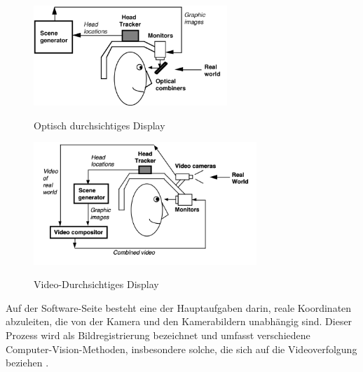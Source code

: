 \newpage

\vspace{1cm}

\begin{figure}[h!]
    \centering
    \includegraphics[width=0.65\textwidth]{attachments/Diagram_2.png}
    \caption{Optisch durchsichtiges Display}  \cite{Azuma1997ASO}
    \end{figure}


\vspace{1cm}

\begin{figure}[h!]
    \centering
    \includegraphics[width=0.75\textwidth]{attachments/Diagram_1.png}
    \caption{Video-Durchsichtiges Display}  \cite{Azuma1997ASO}
    \end{figure}

Auf der Software-Seite besteht eine der Hauptaufgaben darin, reale Koordinaten abzuleiten, die von der Kamera und den Kamerabildern unabhängig sind. Dieser Prozess wird als Bildregistrierung bezeichnet und umfasst verschiedene Computer-Vision-Methoden, insbesondere solche, die sich auf die Videoverfolgung beziehen \cite{Azuma2001RecentAI}.